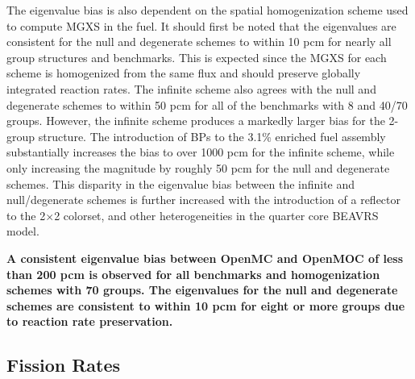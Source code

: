 
The eigenvalue bias is also dependent on the spatial homogenization scheme used to compute \ac{MGXS} in the fuel. It should first be noted that the eigenvalues are consistent for the null and degenerate schemes to within 10 \ac{pcm} for nearly all group structures and benchmarks. This is expected since the \ac{MGXS} for each scheme is homogenized from the same flux and should preserve globally integrated reaction rates. The infinite scheme also agrees with the null and degenerate schemes to within 50 \ac{pcm} for all of the benchmarks with 8 and 40/70 groups. However, the infinite scheme produces a markedly larger bias for the 2-group structure. The introduction of \acp{BP} to the 3.1\% enriched fuel assembly substantially increases the bias to over 1000 \ac{pcm} for the infinite scheme, while only increasing the magnitude by roughly 50 \ac{pcm} for the null and degenerate schemes. This disparity in the eigenvalue bias between the infinite and null/degenerate schemes is further increased with the introduction of a reflector to the 2$\times$2 colorset, and other heterogeneities in the quarter core \ac{BEAVRS} model.


\begin{emphbox}
\textbf{A consistent eigenvalue bias between OpenMC and OpenMOC of less than 200 \ac{pcm} is observed for all benchmarks and homogenization schemes with 70 groups. The eigenvalues for the null and degenerate schemes are consistent to within 10 \ac{pcm} for eight or more groups due to reaction rate preservation.}
\end{emphbox}

\subsection{Fission Rates}
\label{subsec:chap8-fiss-rates}

